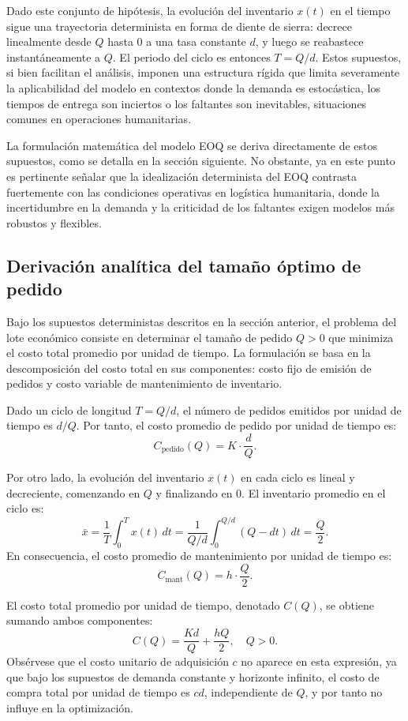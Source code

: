 \documentclass[
  spanish,
  us-letterpaper,
]{scrreprt}
\numberwithin{equation}{section}
\begin{document}
Dado este conjunto de hipótesis, la evolución del inventario \(x(t)\) en
el tiempo sigue una trayectoria determinista en forma de diente de
sierra: decrece linealmente desde \(Q\) hasta \(0\) a una tasa constante
\(d\), y luego se reabastece instantáneamente a \(Q\). El periodo del
ciclo es entonces \(T = Q/d\). Estos supuestos, si bien facilitan el
análisis, imponen una estructura rígida que limita severamente la
aplicabilidad del modelo en contextos donde la demanda es estocástica,
los tiempos de entrega son inciertos o los faltantes son inevitables,
situaciones comunes en operaciones humanitarias.

La formulación matemática del modelo EOQ se deriva directamente de estos
supuestos, como se detalla en la sección siguiente. No obstante, ya en
este punto es pertinente señalar que la idealización determinista del
EOQ contrasta fuertemente con las condiciones operativas en logística
humanitaria, donde la incertidumbre en la demanda y la criticidad de los
faltantes exigen modelos más robustos y flexibles.

\subsection{Derivación analítica del tamaño óptimo de
pedido}\label{derivaciuxf3n-analuxedtica-del-tamauxf1o-uxf3ptimo-de-pedido}

Bajo los supuestos deterministas descritos en la sección anterior, el
problema del lote económico consiste en determinar el tamaño de pedido
\(Q > 0\) que minimiza el costo total promedio por unidad de tiempo. La
formulación se basa en la descomposición del costo total en sus
componentes: costo fijo de emisión de pedidos y costo variable de
mantenimiento de inventario.

Dado un ciclo de longitud \(T = Q/d\), el número de pedidos emitidos por
unidad de tiempo es \(d/Q\). Por tanto, el costo promedio de pedido por
unidad de tiempo es: \[
C_{\text{pedido}}(Q) = K \cdot \frac{d}{Q}.
\]

Por otro lado, la evolución del inventario \(x(t)\) en cada ciclo es
lineal y decreciente, comenzando en \(Q\) y finalizando en \(0\). El
inventario promedio en el ciclo es: \[
\bar{x} = \frac{1}{T} \int_0^T x(t) \, dt = \frac{1}{Q/d} \int_0^{Q/d} (Q - d t) \, dt = \frac{Q}{2}.
\] En consecuencia, el costo promedio de mantenimiento por unidad de
tiempo es: \[
C_{\text{mant}}(Q) = h \cdot \frac{Q}{2}.
\]

El costo total promedio por unidad de tiempo, denotado \(C(Q)\), se
obtiene sumando ambos componentes: \[
C(Q) = \frac{K d}{Q} + \frac{h Q}{2}, \quad Q > 0.
\] Obsérvese que el costo unitario de adquisición \(c\) no aparece en
esta expresión, ya que bajo los supuestos de demanda constante y
horizonte infinito, el costo de compra total por unidad de tiempo es
\(c d\), independiente de \(Q\), y por tanto no influye en la
optimización.
\end{document}
